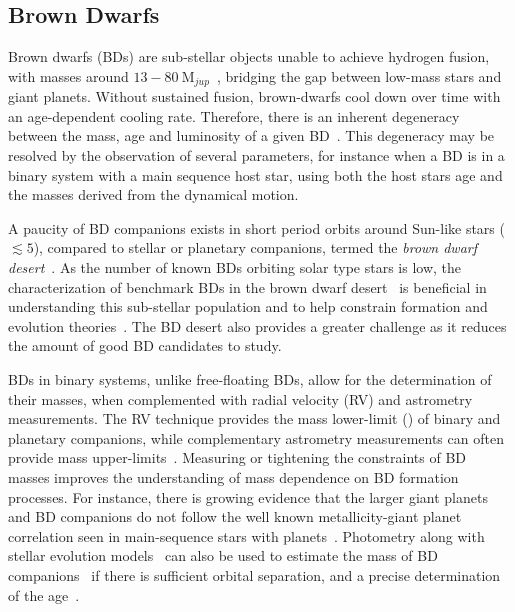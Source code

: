 \subsection{Brown Dwarfs}
Brown dwarfs (BDs) are sub-stellar objects unable to achieve hydrogen fusion, with masses around \(13-80~\textrm{M}_{jup} \)~\citep{chabrier_theory_2000}, bridging the gap between low-mass stars and giant planets.
Without sustained fusion, brown-dwarfs cool down over time with an age-dependent cooling rate.
Therefore, there is an inherent degeneracy between the mass, age and luminosity of a given BD~\citep{burrows_nongray_1997}.
This degeneracy may be resolved by the observation of several parameters, for instance when a BD is in a binary system with a main sequence host star, using both the host stars age and the masses derived from the dynamical motion.

A paucity of BD companions exists in short period orbits around Sun-like stars (\(\lesssim5 \)\AU), compared to stellar or planetary companions, termed the \emph{brown dwarf desert}~\citep{halbwachs_exploring_2000, zucker_analysis_2001, sahlmann_search_2011}.
As the number of known BDs orbiting solar type stars is low, the characterization of benchmark BDs in the brown dwarf desert~\citep[e.g.][]{crepp_trends_2016} is beneficial in understanding this sub-stellar population and to help constrain formation and evolution theories~\citep{whitworth_formation_2007}.
The BD desert also provides a greater challenge as it reduces the amount of good BD candidates to study.

BDs in binary systems, unlike free-floating BDs, allow for the determination of their masses, when complemented with radial velocity ({RV}) and astrometry measurements.
The {RV} technique provides the mass lower-limit (\mtwosini{}) of binary and planetary companions, while complementary astrometry measurements can often provide mass upper-limits~\citep[e.g.][]{sahlmann_search_2011}.
Measuring or tightening the constraints of BD masses improves the understanding of mass dependence on BD formation processes.
For instance, there is growing evidence that the larger giant planets and BD companions do not follow the well known metallicity-giant planet correlation seen in main-sequence stars with planets~\citep[e.g.][]{santos_spectroscopic_2004,santos_observational_2017, maldonado_searching_2017}.
Photometry along with stellar evolution models~\citep[e.g.][]{baraffe_evolutionary_2003,allard_btsettl_2013} can also be used to estimate the mass of BD companions~\citep[e.g.][]{moutou_eccentricity_2017} if there is sufficient orbital separation, and a precise determination of the age~\citep{soderblom_ages_2010}.